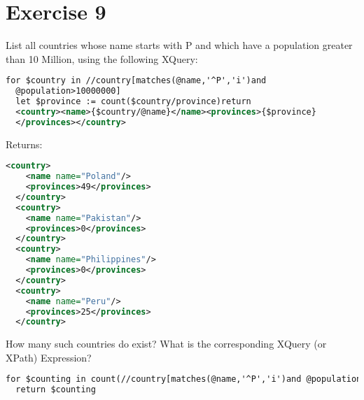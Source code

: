 \section{Exercise 9}
List all countries whose name starts with P and which have a population greater than 10
Million, using the following XQuery:
\begin{lstlisting}[language=XML]
  for $country in //country[matches(@name,'^P','i')and
  @population>10000000]
  let $province := count($country/province)return
  <country><name>{$country/@name}</name><provinces>{$province}
  </provinces></country>
\end{lstlisting}
Returns:
\begin{lstlisting}[language=XML]
  <country>
    <name name="Poland"/>
    <provinces>49</provinces>
  </country>
  <country>
    <name name="Pakistan"/>
    <provinces>0</provinces>
  </country>
  <country>
    <name name="Philippines"/>
    <provinces>0</provinces>
  </country>
  <country>
    <name name="Peru"/>
    <provinces>25</provinces>
  </country>
\end{lstlisting}
How many such countries do exist? What is the corresponding XQuery (or XPath) Expression?
\begin{lstlisting}[language=XML]
  for $counting in count(//country[matches(@name,'^P','i')and @population>10000000])
  return $counting
\end{lstlisting}
